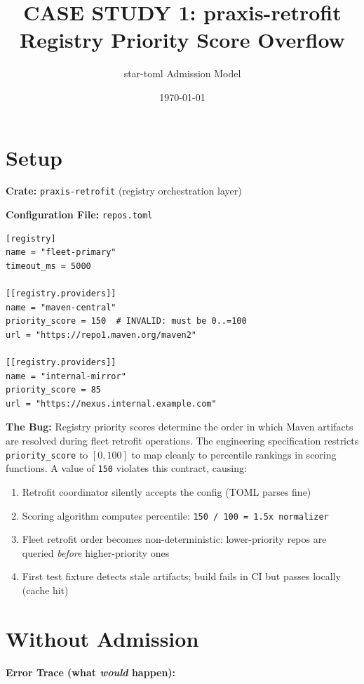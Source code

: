 \documentclass[11pt,a4paper]{article}
\title{CASE STUDY 1: praxis-retrofit Registry Priority Score Overflow}
\author{star-toml Admission Model}
\date{\today}
\begin{document}
\maketitle

\section*{Setup}

\textbf{Crate:} \texttt{praxis-retrofit} (registry orchestration layer)

\textbf{Configuration File:} \texttt{repos.toml}
\begin{lstlisting}
[registry]
name = "fleet-primary"
timeout_ms = 5000

[[registry.providers]]
name = "maven-central"
priority_score = 150  # INVALID: must be 0..=100
url = "https://repo1.maven.org/maven2"

[[registry.providers]]
name = "internal-mirror"
priority_score = 85
url = "https://nexus.internal.example.com"
\end{lstlisting}

\textbf{The Bug:} Registry priority scores determine the order in which Maven artifacts are resolved during fleet retrofit operations. The engineering specification restricts \texttt{priority\_score} to $[0, 100]$ to map cleanly to percentile rankings in scoring functions. A value of \texttt{150} violates this contract, causing:
\begin{enumerate}
  \item Retrofit coordinator silently accepts the config (TOML parses fine)
  \item Scoring algorithm computes percentile: \texttt{150 / 100 = 1.5x normalizer}
  \item Fleet retrofit order becomes non-deterministic: lower-priority repos are queried \emph{before} higher-priority ones
  \item First test fixture detects stale artifacts; build fails in CI but passes locally (cache hit)
\end{enumerate}

\section*{Without Admission}

\textbf{Error Trace (what \emph{would} happen):}
\end{document}
